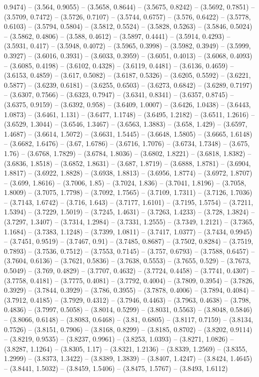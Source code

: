 0.9474) -- (3.564, 0.9055) -- (3.5658, 0.8644) -- (3.5675, 0.8242) -- (3.5692, 0.7851) -- (3.5709, 0.7472) -- (3.5726, 0.7107) -- (3.5744, 0.6757) -- (3.576, 0.6422) -- (3.5778, 0.6103) -- (3.5794, 0.5804) -- (3.5812, 0.5524) -- (3.5828, 0.5263) -- (3.5846, 0.5024) -- (3.5862, 0.4806) -- (3.588, 0.4612) -- (3.5897, 0.4441) -- (3.5914, 0.4293) -- (3.5931, 0.417) -- (3.5948, 0.4072) -- (3.5965, 0.3998) -- (3.5982, 0.3949) -- (3.5999, 0.3927) -- (3.6016, 0.3931) -- (3.6033, 0.3959) -- (3.6051, 0.4013) -- (3.6068, 0.4093) -- (3.6085, 0.4198) -- (3.6102, 0.4328) -- (3.6119, 0.4481) -- (3.6136, 0.4659) -- (3.6153, 0.4859) -- (3.617, 0.5082) -- (3.6187, 0.5326) -- (3.6205, 0.5592) -- (3.6221, 0.5877) -- (3.6239, 0.6181) -- (3.6255, 0.6503) -- (3.6273, 0.6842) -- (3.6289, 0.7197) -- (3.6307, 0.7566) -- (3.6323, 0.7947) -- (3.6341, 0.8341) -- (3.6357, 0.8745) -- (3.6375, 0.9159) -- (3.6392, 0.958) -- (3.6409, 1.0007) -- (3.6426, 1.0438) -- (3.6443, 1.0873) -- (3.6461, 1.131) -- (3.6477, 1.1748) -- (3.6495, 1.2182) -- (3.6511, 1.2616) -- (3.6529, 1.3044) -- (3.6546, 1.3467) -- (3.6563, 1.3883) -- (3.658, 1.429) -- (3.6597, 1.4687) -- (3.6614, 1.5072) -- (3.6631, 1.5445) -- (3.6648, 1.5805) -- (3.6665, 1.6148) -- (3.6682, 1.6476) -- (3.67, 1.6786) -- (3.6716, 1.7076) -- (3.6734, 1.7348) -- (3.675, 1.76) -- (3.6768, 1.7829) -- (3.6784, 1.8036) -- (3.6802, 1.8221) -- (3.6818, 1.8382) -- (3.6836, 1.8518) -- (3.6852, 1.8631) -- (3.687, 1.8719) -- (3.6888, 1.8781) -- (3.6904, 1.8817) -- (3.6922, 1.8828) -- (3.6938, 1.8813) -- (3.6956, 1.8774) -- (3.6972, 1.8707) -- (3.699, 1.8616) -- (3.7006, 1.85) -- (3.7024, 1.836) -- (3.7041, 1.8196) -- (3.7058, 1.8009) -- (3.7075, 1.7798) -- (3.7092, 1.7565) -- (3.7109, 1.7311) -- (3.7126, 1.7036) -- (3.7143, 1.6742) -- (3.716, 1.643) -- (3.7177, 1.6101) -- (3.7195, 1.5754) -- (3.7211, 1.5394) -- (3.7229, 1.5019) -- (3.7245, 1.4631) -- (3.7263, 1.4233) -- (3.728, 1.3824) -- (3.7297, 1.3407) -- (3.7314, 1.2984) -- (3.7331, 1.2555) -- (3.7349, 1.2121) -- (3.7365, 1.1684) -- (3.7383, 1.1248) -- (3.7399, 1.0811) -- (3.7417, 1.0377) -- (3.7434, 0.9945) -- (3.7451, 0.9519) -- (3.7467, 0.91) -- (3.7485, 0.8687) -- (3.7502, 0.8284) -- (3.7519, 0.7893) -- (3.7536, 0.7512) -- (3.7553, 0.7145) -- (3.757, 0.6793) -- (3.7588, 0.6457) -- (3.7604, 0.6136) -- (3.7621, 0.5836) -- (3.7638, 0.5553) -- (3.7655, 0.529) -- (3.7673, 0.5049) -- (3.769, 0.4829) -- (3.7707, 0.4632) -- (3.7724, 0.4458) -- (3.7741, 0.4307) -- (3.7758, 0.4181) -- (3.7775, 0.4081) -- (3.7792, 0.4004) -- (3.7809, 0.3954) -- (3.7826, 0.3929) -- (3.7844, 0.3929) -- (3.786, 0.3955) -- (3.7878, 0.4006) -- (3.7894, 0.4084) -- (3.7912, 0.4185) -- (3.7929, 0.4312) -- (3.7946, 0.4463) -- (3.7963, 0.4638) -- (3.798, 0.4836) -- (3.7997, 0.5058) -- (3.8014, 0.5299) -- (3.8031, 0.5563) -- (3.8048, 0.5846) -- (3.8066, 0.6148) -- (3.8083, 0.6468) -- (3.81, 0.6805) -- (3.8117, 0.7159) -- (3.8134, 0.7526) -- (3.8151, 0.7906) -- (3.8168, 0.8299) -- (3.8185, 0.8702) -- (3.8202, 0.9114) -- (3.8219, 0.9535) -- (3.8237, 0.9961) -- (3.8253, 1.0393) -- (3.8271, 1.0826) -- (3.8287, 1.1264) -- (3.8305, 1.17) -- (3.8321, 1.2136) -- (3.8339, 1.2569) -- (3.8355, 1.2999) -- (3.8373, 1.3422) -- (3.8389, 1.3839) -- (3.8407, 1.4247) -- (3.8424, 1.4645) -- (3.8441, 1.5032) -- (3.8459, 1.5406) -- (3.8475, 1.5767) -- (3.8493, 1.6112) 